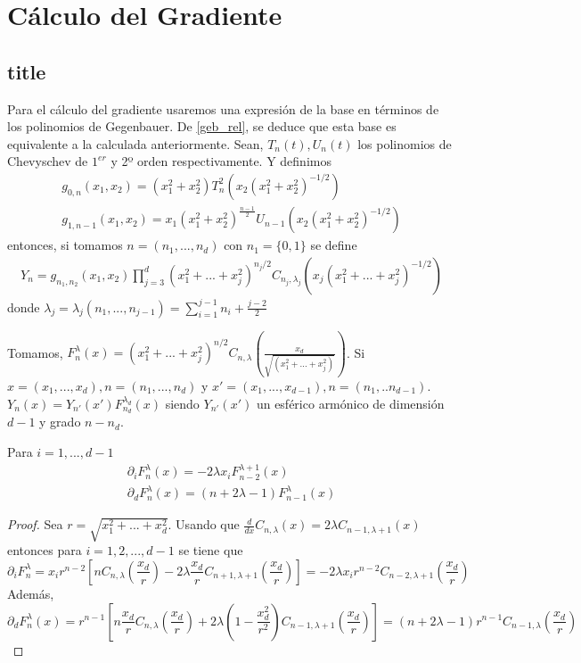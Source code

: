 \chapter[Cálculo del Gradiente]{Cálculo del Gradiente}
\section{title}
Para el cálculo del gradiente usaremos una expresión de la base en términos de los polinomios de Gegenbauer. De \ref{geb_rel}, se deduce que esta base es equivalente a la calculada anteriormente.
Sean, $T_{n}(t),U_{n}(t)$ los polinomios de Chevyschev de $1^{er}$ y 2º orden respectivamente.	Y definimos
\begin{gather*}
 g_{0,n}(x_1,x_2) = (x_1^2+x_2^2)T_n^2(x_2(x_1^2+x_2^2)^{-1/2})
\\
g_{1,n-1}(x_1,x_2) = x_1(x_1^2+x_2^2)^{\frac{n-1}{2}}U_{n-1}(x_2(x_1^2+x_2^2)^{-1/2})
\end{gather*}
entonces, si tomamos $n=(n_1,...,n_d)$ con $n_1 = \{0,1\}$ se define
\begin{gather*}
Y_n = g_{n_1,n_2}(x_1,x_2)\prod_{j=3}^{d}(x_1^2+...+x_j^2)^{n_j/2}C_{n_j,\lambda_j}(x_j(x_1^2+...+x_j^2)^{-1/2})
\end{gather*}
donde $\lambda_j =\lambda_j(n_1,...,n_{j-1}) = \sum_{i=1}^{j-1}n_i + \frac{j-2}{2}$


Tomamos, $F_n^\lambda (x) = (x_1^2+...+x_j^2)^{n/2}C_{n,\lambda}(\frac{x_d}{\sqrt{(x_1^2+...+x_j^2)}})$.
Si $x=(x_1,...,x_d), n=(n_1,...,n_d)$ y $x' = (x_1,...,x_{d-1}), n=(n_1,..n_{d-1})$.
$Y_n(x) = Y_{n'}(x') F_{n_d}^{\lambda_d} (x)$ siendo $ Y_{n'}(x')$ un esférico armónico de dimensión $d-1$ y grado $n-n_d$.
\begin{prop}Para $i=1,...,d-1$
	\begin{gather*}
	\partial_i  F_{n}^\lambda(x) = -2\lambda x_i F_{n-2}^{\lambda+1}(x) \\ 
	\partial_d F_{n}^{\lambda}(x) = (n+2\lambda-1)  F_{n-1}^{\lambda}(x)
	\end{gather*}
\end{prop}
\begin{proof}
	Sea $r=\sqrt{x_1^2+...+x_d^2}$. Usando que $\frac{d}{dx}C_{n,\lambda}(x) = 2\lambda C_{n-1,\lambda+1}(x)$ entonces para $i=1,2,...,d-1$ se tiene que$$
	\partial_i F_{n}^{\lambda} = x_i r^{n-2} \left[ n C_{n,\lambda}(\frac{x_d}{r})-2\lambda\frac{x_d}{r}C_{n+1,\lambda+1}(\frac{x_d}{r})\right] = -2\lambda x_ir^{n-2}C_{n-2,\lambda+1}(\frac{x_d}{r})
	$$
	Además, $$
	\partial_d F_{n}^{\lambda}(x) = r^{n-1}\left[n\frac{x_d}{r}C_{n,\lambda}(\frac{x_d}{r})+2\lambda(1-\frac{x_d^2}{r^2})C_{n-1,\lambda+1}(\frac{x_d}{r})\right] = (n+2\lambda-1)r^{n-1}C_{n-1,\lambda}(\frac{x_d}{r})
	$$
\end{proof}

